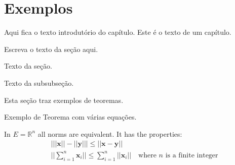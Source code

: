 %
%
%
%



\part{Exemplos}


  Aqui fica o texto introdutório do capítulo.
  Este é o texto de um capítulo.

 
        Escreva o texto da seção aqui. 
    
    
                
                Texto da seção.
        

                    Texto da subsubseção.




        Esta seção traz exemplos de teoremas.


            Exemplo de Teorema com várias equações.

            \begin{theorem}
                In $E=\mathbb{R}^n$ all norms are equivalent. It has the properties:
                \begin{align}
                    & \big| ||\mathbf{x}|| - ||\mathbf{y}|| \big|\leq || \mathbf{x}- \mathbf{y}||\\
                    &  ||\sum_{i=1}^n\mathbf{x}_i||\leq \sum_{i=1}^n||\mathbf{x}_i||\quad\text{where $n$ is a finite integer}
                \end{align}
            \end{theorem}

